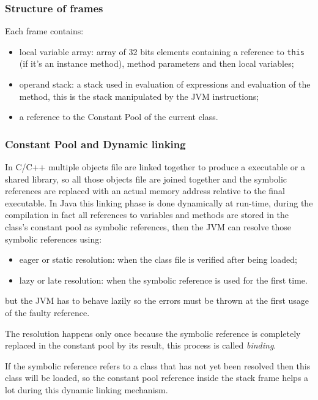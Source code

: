 \subsubsection{Structure of frames}
Each frame contains:
\begin{itemize}
    \item local variable array: array of 32 bits elements containing a reference to \verb|this| (if it's an instance method), method parameters and then local variables;

    \item operand stack: a stack used in evaluation of expressions and evaluation of the method, this is the stack manipulated by the JVM instructions;
    
    \item a reference to the Constant Pool of the current class.
\end{itemize}

\subsubsection{Constant Pool and Dynamic linking}
In C/C++ multiple objects file are linked together to produce a executable or a shared library, so all those objects file are joined together and the symbolic references are replaced with an actual memory address relative to the final executable.
In Java this linking phase is done dynamically at run-time, during the compilation in fact all references to variables and methods are stored in the class's constant pool as symbolic references, then the JVM can resolve those symbolic references using:
\begin{itemize}
    \item eager or static resolution: when the class file is verified after being loaded;
    \item lazy or late resolution: when the symbolic reference is used for the first time.
\end{itemize}
but the JVM has to behave lazily so the errors must be thrown at the first usage of the faulty reference.

The resolution happens only once because the symbolic reference is completely replaced in the constant pool by its result, this process is called \emph{binding}.

If the symbolic reference refers to a class that has not yet been resolved then this class will be loaded, so the constant pool reference inside the stack frame helps a lot during this dynamic linking mechanism.

